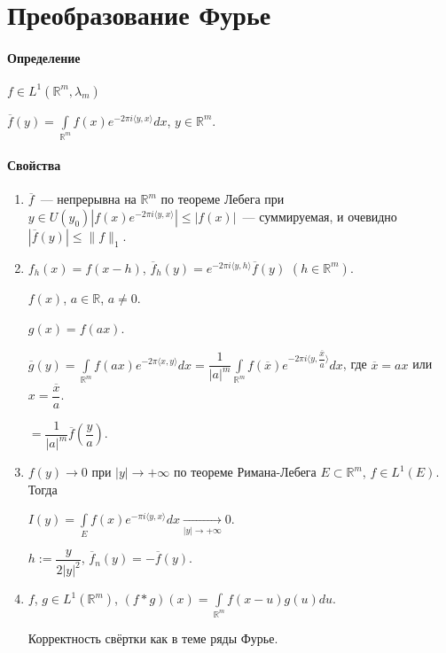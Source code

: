 \documentclass{article}
\begin{document}
\part{Преобразование Фурье}

    \subsection{Определение}
        
        $f \in L^1 (\mathbb{R}^m, \lambda_m)$
        
        $\overline{f}(y) = \int\limits_{\mathbb{R}^m} f(x) e^{-2 \pi i \langle y, x \rangle} dx$, $y \in \mathbb{R}^m$.
        
    \subsection{Свойства}
    
        \begin{enumerate}
        
            \item $\overline{f}$~--- непрерывна на $\mathbb{R}^m$ по теореме Лебега при $y \in U(y_0) \left| f(x) e^{-2 \pi i \langle y, x \rangle} \right| \leqslant \left| f(x) \right|$~--- суммируемая, и очевидно $\left| \overline{f}(y) \right| \leqslant \| f \|_1$.
            
            \item $f_h(x) = f(x - h)$, $\overline{f}_h(y) = e^{-2 \pi i \langle y, h \rangle} \overline{f}(y)$ $(h \in \mathbb{R}^m)$.
            
                $f(x)$, $a \in \mathbb{R}$, $a \neq 0$.
    
                $g(x) = f(ax)$.
    
                $\overline{g}(y) = \int\limits_{\mathbb{R}^m} f(ax) e^{-2 \pi \langle x, y \rangle}dx = \dfrac{1}{|a|^m} \int\limits_{\mathbb{R}^m} f(\overline{x}) e^{-2 \pi i \langle y, \dfrac{\overline{x}}{a} \rangle } dx$, где $\overline{x} = ax$ или $x = \dfrac{\overline{x}}{a}$.
    
                $= \dfrac{1}{|a|^m} \overline{f} \left( \dfrac{y}{a} \right)$.
    
            \item $f(y) \rightarrow 0$ при $|y| \rightarrow +\infty$ по теореме Римана-Лебега $E \subset \mathbb{R}^m$, $f \in L^1 (E)$. Тогда
            
                $I(y) = \int\limits_E f(x) e^{-\pi i \langle y, x \rangle} dx \xrightarrow[|y| \rightarrow +\infty]{} 0$.
                
                $h := \dfrac{y}{2 |y|^2}$, $\overline{f}_n(y) = -\overline{f}(y)$.
                
            \item $f$, $g \in L^1 \left( \mathbb{R}^m \right)$, $(f * g)(x) = \int\limits_{\mathbb{R}^m} f(x - u) g(u) du$.
            
                Корректность свёртки как в теме ряды Фурье.
                
        \end{enumerate}
    
\end{document}
